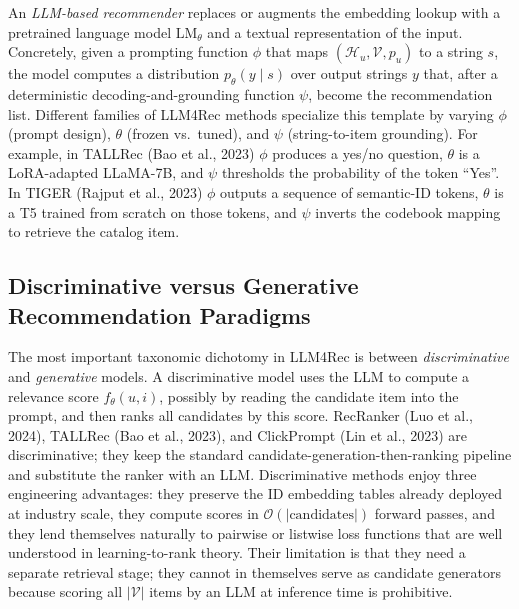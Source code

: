 An \emph{LLM-based recommender} replaces or augments the embedding lookup with a pretrained language model \(\text{LM}_\theta\) and a textual representation of the input. Concretely, given a prompting function \(\phi\) that maps \((\mathcal{H}_u, \mathcal{V}, p_u)\) to a string \(s\), the model computes a distribution \(p_\theta(y \mid s)\) over output strings \(y\) that, after a deterministic decoding-and-grounding function \(\psi\), become the recommendation list. Different families of LLM4Rec methods specialize this template by varying \(\phi\) (prompt design), \(\theta\) (frozen vs.~tuned), and \(\psi\) (string-to-item grounding). For example, in TALLRec (Bao et al., 2023) \(\phi\) produces a yes/no question, \(\theta\) is a LoRA-adapted LLaMA-7B, and \(\psi\) thresholds the probability of the token ``Yes''. In TIGER (Rajput et al., 2023) \(\phi\) outputs a sequence of semantic-ID tokens, \(\theta\) is a T5 trained from scratch on those tokens, and \(\psi\) inverts the codebook mapping to retrieve the catalog item.

\subsection{Discriminative versus Generative Recommendation Paradigms}\label{discriminative-versus-generative-recommendation-paradigms}

The most important taxonomic dichotomy in LLM4Rec is between \emph{discriminative} and \emph{generative} models. A discriminative model uses the LLM to compute a relevance score \(f_\theta(u,i)\), possibly by reading the candidate item into the prompt, and then ranks all candidates by this score. RecRanker (Luo et al., 2024), TALLRec (Bao et al., 2023), and ClickPrompt (Lin et al., 2023) are discriminative; they keep the standard candidate-generation-then-ranking pipeline and substitute the ranker with an LLM. Discriminative methods enjoy three engineering advantages: they preserve the ID embedding tables already deployed at industry scale, they compute scores in \(\mathcal{O}(|\text{candidates}|)\) forward passes, and they lend themselves naturally to pairwise or listwise loss functions that are well understood in learning-to-rank theory. Their limitation is that they need a separate retrieval stage; they cannot in themselves serve as candidate generators because scoring all \(|\mathcal{V}|\) items by an LLM at inference time is prohibitive.

